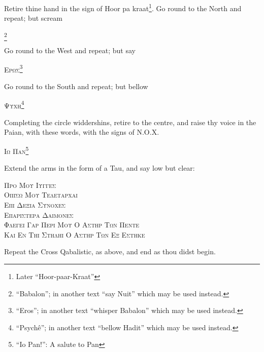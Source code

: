 Retire thine hand in the sign of Hoor pa kraat\footnote{Later \enquote{Hoor-paar-Kraat}}. Go round to the North and repeat; but scream \begin{quoting}[indentfirst=false]\textgreek{\textsc{\GreekBabalon}}\footnote{\enquote{Babalon}; in another text \enquote{say Nuit} which may be used instead.} \end{quoting}

Go round to the West and repeat; but say \begin{quoting}[indentfirst=false]\textgreek{\textsc{Ερωσ}}\footnote{\enquote{Eros}; in another text \enquote{whisper Babalon} which may be used instead.} \end{quoting}

Go round to the South and repeat; but bellow \begin{quoting}[indentfirst=false]\textgreek{\textsc{Ψυχη}}\footnote{\enquote{Psych\^e}; in another text \enquote{bellow Hadit} which may be used instead.} \end{quoting}

Completing the circle widdershins, retire to the centre, and raise thy voice in the Paian, with these words, with the signs of N.O.X. \begin{quoting}[indentfirst=false]\textgreek{\textsc{Ιω Παν}}\footnote{\enquote{Io Pan!}: A salute to Pan}\end{quoting}

Extend the arms in the form of a Tau, and say low but clear:

\begin{quoting}[indentfirst=false]
\textgreek{\textsc{Προ Μου Ιυγγεσ}} \\
\textgreek{\textsc{Οπισω Μου Τελεταρχαι}} \\
\textgreek{\textsc{Επι Δεξια Συνοχεσ}} \\
\textgreek{\textsc{Επαριστερα Δαιμονεσ}} \\
\textgreek{\textsc{Φλεγει Γαρ Περι Μου Ο Αστηρ Των Πεντε}} \\
\textgreek{\textsc{Και Εν Τηι Στηληι Ο Αστηρ Των Εξ Εστηκε}}\footnotemark
\end{quoting}

Repeat the Cross Qabalistic, as above, and end as thou didst begin.
